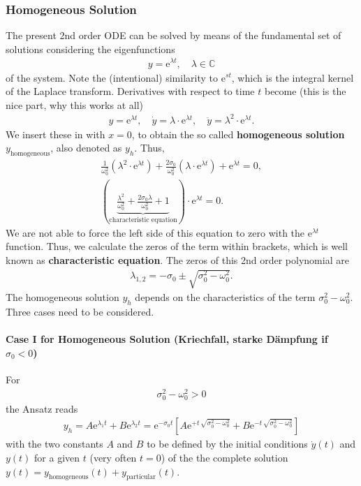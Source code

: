 \subsubsection{Homogeneous Solution}
\label{Sec:FundamentalSet}
The present 2nd order ODE can be solved by means of the
fundamental set of solutions
considering the eigenfunctions
\begin{align}
y = \mathrm{e}^{\lambda t}, \quad \lambda\in\mathbb{C}
\end{align}
of the system. Note the (intentional) similarity to $\mathrm{e}^{s t}$,
which is the integral kernel of the Laplace transform.
%
Derivatives with respect to time $t$ become (this is the nice part, why this
works at all)
\begin{align}
y = \mathrm{e}^{\lambda t},\quad
\dot{y} = \lambda \cdot \mathrm{e}^{\lambda t},\quad
\ddot{y} = \lambda^2 \cdot \mathrm{e}^{\lambda t}.
\end{align}
%
We insert these in  with $x=0$, to obtain the
so called \textbf{homogeneous solution} $y_\text{homogeneous}$, also denoted as
$y_h$.
Thus,
\begin{align}
\frac{1}{\omega_0^2} (\lambda^2 \cdot \mathrm{e}^{\lambda t}) +
\frac{2 \sigma_0}{\omega_0^2} (\lambda \cdot \mathrm{e}^{\lambda t}) +
\mathrm{e}^{\lambda t} = 0,\nonumber\\
\label{eq:CharEq}
\left(\underbrace{\frac{\lambda^2}{\omega_0^2} +
\frac{2 \sigma_0 \lambda}{\omega_0^2} + 1}_\text{characteristic equation}\right)
\cdot \mathrm{e}^{\lambda t} = 0.
\end{align}
%
We are not able to force the left side of this equation to zero with the $\mathrm{e}^{\lambda t}$
function.
Thus, we calculate the zeros of the term within brackets, which is well known as
\textbf{characteristic equation}.
%
The zeros of this 2nd order polynomial are
\begin{align}
\label{eq:lambda12}
\lambda_{1,2} = -\sigma_0 \pm \sqrt{\sigma_0^2 - \omega_0^2}.
\end{align}
%
The homogeneous solution $y_h$ depends on the characteristics
of the term $\sigma_0^2 - \omega_0^2$.
Three cases need to be considered.

\paragraph{Case I for Homogeneous Solution (Kriechfall, starke Dämpfung if $\sigma_0<0$)}
For
\begin{align}
\sigma_0^2 - \omega_0^2 > 0
\end{align}
the Ansatz reads
\begin{align}
y_h=
A \mathrm{e}^{\lambda_1 t} + B \mathrm{e}^{\lambda_2 t}
=
\mathrm{e}^{-\sigma_0 t} [A \mathrm{e}^{+t\,\sqrt{\sigma_0^2 - \omega_0^2}}
+ B \mathrm{e}^{-t\,\sqrt{\sigma_0^2 - \omega_0^2}}]
\end{align}
with the two constants $A$ and $B$ to be defined by the initial conditions
$\dot{y}(t)$ and $y(t)$ for a given $t$ (very often $t=0$)
of the the complete solution
$y(t) = y_\text{homogeneous}(t)+y_\text{particular}(t)$.

